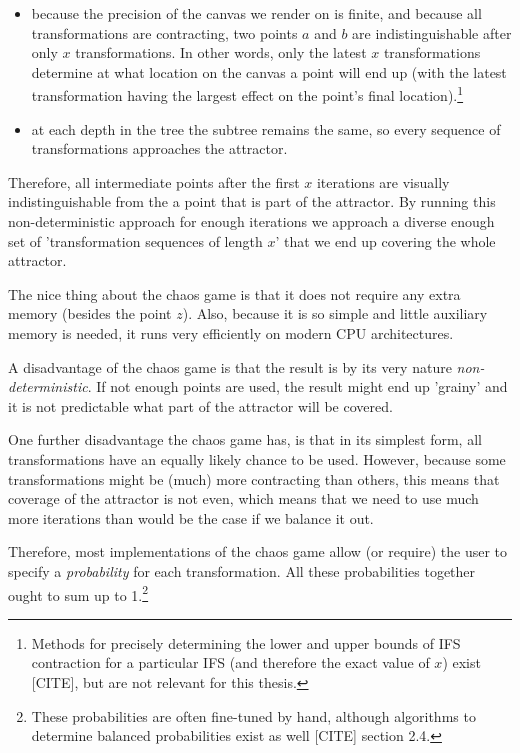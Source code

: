 \documentclass[11pt]{article}
\begin{document}
\begin{itemize}
\item because the precision of the canvas we render on is finite, and because all transformations are contracting,
two points \(a\) and \(b\) are indistinguishable after only \(x\) transformations.
 In other words, only the latest \(x\) transformations determine at what location on the canvas a point will end up (with the latest transformation having the largest effect on the point's final location).\footnote{Methods for precisely determining the lower and upper bounds of IFS contraction for a particular IFS (and therefore the exact value of \(x\)) exist [CITE], 
but are not relevant for this thesis.}
\item at each depth in the tree the subtree remains the same, so every sequence of transformations approaches the attractor.
\end{itemize}

Therefore, all intermediate points after the first \(x\) iterations are visually indistinguishable from the a point that is part of the attractor.
By running this non-deterministic approach for enough iterations we approach a diverse enough set of 'transformation sequences of length \(x\)' that we end up covering the whole attractor.

The nice thing about the chaos game is that it does not require any extra memory (besides the point \(z\)).
Also, because it is so simple and little auxiliary memory is needed, it runs very efficiently on modern CPU architectures.

A disadvantage of the chaos game is that the result is by its very nature \emph{non-deterministic}.
If not enough points are used, the result might end up 'grainy' and it is not predictable what part of the attractor will be covered.


One further disadvantage the chaos game has, is that in its simplest form, all transformations have an equally likely chance to be used.
However, because some transformations might be (much) more contracting than others, this means that coverage of the attractor is not even,
which means that we need to use much more iterations than would be the case if we balance it out.

Therefore, most implementations of the chaos game allow (or require) the user to specify a \emph{probability} for each transformation.
All these probabilities together ought to sum up to 1.\footnote{These probabilities are often fine-tuned by hand, although algorithms to determine balanced probabilities exist as well [CITE] section 2.4.}
\end{document}
